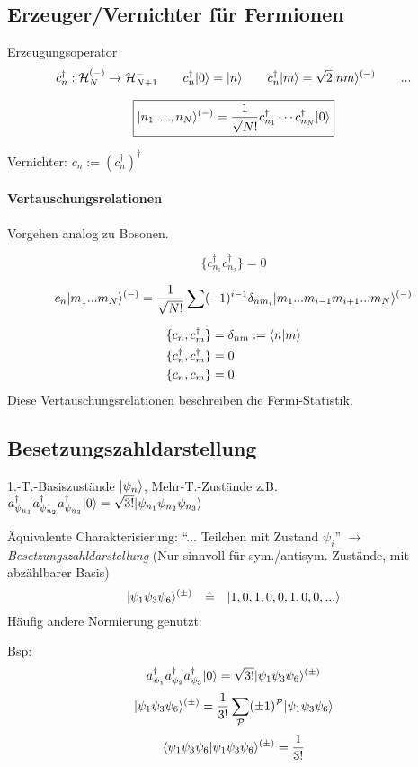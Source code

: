 \documentclass[11pt,a4paper]{report}
\begin{document}
\subsection{Erzeuger/Vernichter für Fermionen}

\newcommand{\createf}[1]{c^\dagger_{#1}}
\newcommand{\destroyf}[1]{c_{#1}}

Erzeugungsoperator
$$\createf{n}:\hil_N^{(-)}\rightarrow \hil_{N+1}^{-}\qquad \createf{n}\ket{0} = \ket{n}\qquad \createf{n}\ket{m} = \sqrt{2}\ket{nm}^{(-)}\qquad ...$$

$$\boxed{\ket{n_1,...,n_N}^{(-)} = \frac{1}{\sqrt{N!}}\createf{n_1}\cdots \createf{n_N} \ket{0}}$$

Vernichter: $\destroyf{n} := (\createf{n})^\dagger$\par 

\paragraph{Vertauschungsrelationen} Vorgehen analog zu Bosonen.

$$\{\createf{n_1}\createf{n_2}\} = 0$$

$$c_n|m_1...m_N\rangle^{(-)} = \frac{1}{\sqrt{N!}}\sum (-1)^{i-1}\delta_{nm_i}|m_1...m_{i-1}m_{i+1}...m_N\rangle^{(-)}$$

\begin{align*}
\{\destroyf{n},\createf{m}\}&=\delta_{nm} :=\sprod{n}{m} \\
\{\createf{n},\createf{m}\} &= 0 \\
\{\destroyf{n},\destroyf{m}\} &= 0
\end{align*}
Diese Vertauschungsrelationen beschreiben die Fermi-Statistik.

\subsection{Besetzungszahldarstellung}

1.-T.-Basiszustände $|\psi_n\rangle$, Mehr-T.-Zustände z.B. $a_{\psi_{n_1}}^\dagger a_{\psi_{n_2}}^\dagger a_{\psi_{n_3}}^\dagger|0\rangle = \sqrt{3!}|\psi_{n_1}\psi_{n_2}\psi_{n_3}\rangle$\par 
Äquivalente Charakterisierung: ``... Teilchen mit Zustand $\psi_i$'' $\rightarrow$ \textit{Besetzungszahldarstellung} (Nur sinnvoll für sym./antisym. Zustände, mit abzählbarer Basis)
$$|\psi_1\psi_3\psi_6\rangle^{(\pm)} \quad \hat{=} \quad |1,0,1,0,0,1,0,0,...\rangle$$
Häufig andere Normierung genutzt:\par 
Bsp: 
$$a_{\psi_{1}}^\dagger a_{\psi_{2}}^\dagger a_{\psi_{3}}^\dagger|0\rangle = \sqrt{3!}|\psi_1\psi_3\psi_6\rangle^{(\pm)}$$
$$|\psi_1\psi_3\psi_6\rangle^{(\pm)}=\frac{1}{3!}\sum_{\mathcal{P}}(\pm 1)^\mathcal{P}|\psi_1\psi_3\psi_6\rangle$$
$$\langle \psi_1\psi_3\psi_6 | \psi_1\psi_3\psi_6 \rangle^{(\pm )} = \frac{1}{3!}$$
\end{document}
